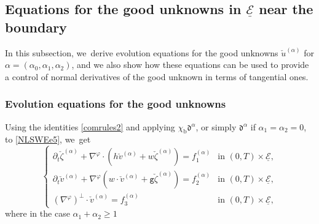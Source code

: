 \documentclass[JEP,XML,SOM,Unicode,NoFloatCountersInSection,published]{cedram}
\newcommand{\gr}{{\mathtt g}}
\newcommand{\dt}{\partial_t}
\newcommand{\cE}{{\mathcal E}}
\newcommand{\ul}[1]{\underline{#1}}
\theoremstyle{definition}
\begin{document}
\subsection{Equations for the good unknowns in $\ul{\cE}$ near the boundary}\label{subsect:EGUe}
In this subsection, we~derive evolution equations for the good unknowns $\check{u}^{(\alpha)}$ for $\alpha=(\alpha_0,\alpha_1,\alpha_2)$,
and we also show how these equations can be used to provide a control of normal derivatives of the good unknown in terms of tangential ones.

\subsubsection{Evolution equations for the good unknowns}
Using the identities \eqref{comrules2} and applying $\chi_\mathrm{b}\mathfrak{d}^{\alpha}$,
or simply $\mathfrak{d}^{\alpha}$ if $\alpha_1=\alpha_2=0$, to \eqref{NLSWEe5}, we~get
\begin{equation}\label{QLSWEe}
\begin{cases}
\dt\check{\zeta}^{(\alpha)}+\nabla^\varphi\cdot(h\check{v}^{(\alpha)}+w\check{\zeta}^{(\alpha)}) = f_1^{(\alpha)} &\text{in } (0,T)\times\ul{\cE}, \\
\dt\check{v}^{(\alpha)}+\nabla^\varphi(w\cdot\check{v}^{(\alpha)}+\gr\check{\zeta}^{(\alpha)}) = f_2^{(\alpha)} &\text{in } (0,T)\times\ul{\cE}, \\
(\nabla^\varphi)^\perp\cdot\check{v}^{(\alpha)} = f_3^{(\alpha)} &\text{in } (0,T)\times\ul{\cE},
\end{cases}
\end{equation}
where in the case $\alpha_1+\alpha_2\geq1$
\end{document}
